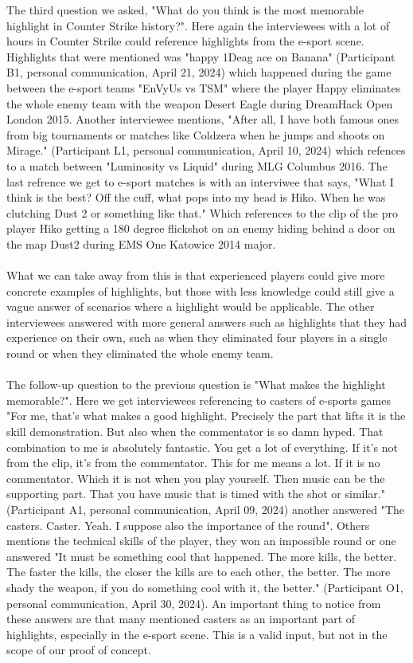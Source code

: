 The third question we asked, "What do you think is the most memorable highlight in Counter Strike history?". Here again the interviewees with a lot of hours in Counter Strike could reference highlights from the e-sport scene. Highlights that were mentioned was "happy 1Deag ace on Banana" (Participant B1, personal communication, April 21, 2024) which happened during the game between the e-sport teams "EnVyUs vs TSM" where the player Happy eliminates the whole enemy team with the weapon Desert Eagle during DreamHack Open London 2015. Another interviewee mentions, "After all, I have both famous ones from big tournaments or matches like Coldzera when he jumps and shoots on Mirage." 
(Participant L1, personal communication, April 10, 2024) which refences to a match between "Luminosity vs Liquid" during MLG Columbus 2016. The last refrence we get to e-sport matches is with an interviwee that says, "What I think is the best? Off the cuff, what pops into my head is Hiko. When he was clutching Dust 2 or something like that." Which references to the clip of the pro player Hiko getting a 180 degree flickshot on an enemy hiding behind a door on the map Dust2 during EMS One Katowice 2014 major.\\\\ 
What we can take away from this is that experienced players could give more concrete examples of highlights, but those with less knowledge could still give a vague answer of scenarios where a highlight would be applicable. 
The other interviewees answered with more general answers such as highlights that they had experience on their own, such as when they eliminated four players in a single round or when they eliminated the whole enemy team.\\\\
The follow-up question to the previous question is "What makes the highlight memorable?". Here we get interviewees referencing to casters of e-sports games "For me, that's what makes a good highlight. Precisely the part that lifts it is the skill demonstration. But also when the commentator is so damn hyped. That combination to me is absolutely fantastic. You get a lot of everything. If it's not from the clip, it's from the commentator. This for me means a lot. If it is no commentator. Which it is not when you play yourself. Then music can be the supporting part. That you have music that is timed with the shot or similar." (Participant A1, personal communication, April 09, 2024) another answered "The casters. Caster. Yeah. I suppose also the importance of the round". Others mentions the technical skills of the player, they won an impossible round or one answered "It must be something cool that happened. The more kills, the better. The faster the kills, the closer the kills are to each other, the better. The more shady the weapon, if you do something cool with it, the better." (Participant O1, personal communication, April 30, 2024). An important thing to notice from these answers are that many mentioned casters as an important part of highlights, especially in the e-sport scene. This is a valid input, but not in the scope of our proof of concept.\\\\
